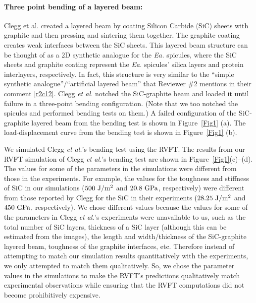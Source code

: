 \documentclass[11pt,letterpaper]{report}
\begin{document}
\begin{enumerate}[label=\textit{2.\arabic*},wide, labelwidth=!, labelindent=0pt]
\paragraph{Three point bending of a layered beam:}
Clegg et al. \cite{clegg1990simple} created a layered beam by coating Silicon Carbide (SiC) sheets with graphite and then pressing and  sintering them together. The graphite coating  creates weak interfaces between the SiC sheets. This layered beam structure can be thought of  as a 2D synthetic analogue for the \textit{Ea.} spicules, where the 
SiC sheets and graphite coating represent the \textit{Ea.} spicules' silica layers and  protein interlayers, respectively. In fact, this structure is very similar to the ``simple synthetic analogue''/``artificial layered beam'' that Reviewer \#2 mentions in their comment \ref{r2c12}. Clegg \textit{et al.} notched the SiC-graphite beam and loaded it until failure in a three-point bending configuration. (Note that we too notched the spicules and performed bending tests on them.) A failed configuration of the SiC-graphite layered beam from the bending test is shown in Figure~\ref{Fig1} (a). The load-displacement curve from the bending test is shown in Figure~\ref{Fig1} (b). 

We simulated Clegg \textit{et al.}'s bending test using the  RVFT. The results from our RVFT simulation of Clegg \textit{et al.}'s bending test are shown in Figure~\ref{Fig1}(c)--(d). The values for some of the parameters in the simulations were different from those in the experiments. For example, the values for the toughness and stiffness of SiC  in our simulations ($500~\rm J/m^2$ and $20.8~\rm GPa$, respectively) were different from those reported by Clegg  for the SiC in their experiments ($28.25~\rm J/m^2$ and $450~\rm GPa$, respectively).  We chose different values because the values for some of the parameters  in Clegg \textit{et al.}'s experiments were unavailable to us, such as the total number of SiC layers, thickness of a SiC layer (although this can be estimated from the images), the length and width/thickness of the SiC-graphite layered beam, toughness of the graphite interfaces, etc. Therefore instead of attempting to match our simulation results quantitatively with the experiments, we only attempted to match them qualitatively. So, we chose the parameter values in the simulations to make the RVFT's predictions qualitatively match experimental observations  while ensuring that the RVFT computations did not become prohibitively expensive.
 

\end{enumerate}
\end{document}

